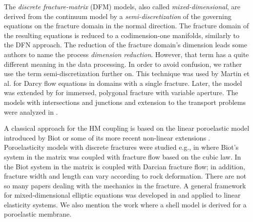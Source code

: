 \documentclass[a4paper]{article}
\numberwithin{equation}{section}
\begin{document}
The \textit{discrete fracture-matrix} (DFM) models, also called \textit{mixed-dimensional}, are derived from the continuum model by a \emph{semi-discretization} of the governing equations on the fracture domain
in the normal direction. The fracture domain of the resulting equations is reduced to a codimension-one manifolds, similarly to the DFN approach. The reduction of the fracture domain's dimension leads some authors to name the process \emph{dimension reduction}. However, that term has a quite different meaning in the data processing. In order to avoid confusion, we rather use the term semi-discretization further on.
% 
This technique was used by Martin et al. \cite{martin_modeling_2005} for Darcy flow equations in domains with a single fracture.
Later, the model was extended by \cite{angot2009asymptotic} for immersed, polygonal fracture with variable aperture. The models with intersections and junctions and extension to the transport problems were analyzed in \cite{maryska2005numerical,pichot2012generalized,formaggia2014reduced, schwenck2015dimensionally}.

A classical approach for the HM coupling is based on the linear poroelastic model introduced by Biot \cite{biot1941general} or some of its more recent non-linear extensions \cite{rutqvist2003role,Jing2007Fluid}. 
Poroelasticity models with discrete fractures were studied e.g., in \cite{ganis2014modeling} where Biot's system in the matrix was coupled with fracture flow based on the cubic law.
In \cite{hanowski2018hydromechanical} the Biot system in the matrix is coupled with Darcian fracture flow; in addition, fracture width and length can vary according to rock deformation.
There are not so many papers dealing with the mechanics in the fracture.
A general framework for mixed-dimensional elliptic equations was developed in \cite{boon2019stable, boon2017functional} and applied to linear elasticity systems.
We also mention the work \cite{mikelic2019derivation} where a shell model is derived for a poroelastic membrane.
\end{document}
